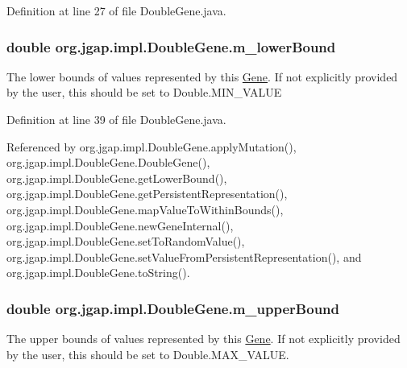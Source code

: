 Definition at line 27 of file Double\-Gene.\-java.

\hypertarget{classorg_1_1jgap_1_1impl_1_1_double_gene_a07193d7a0dc9a450d41463104ee72f02}{
\subsubsection[{m\-\_\-lower\-Bound}]{\setlength{\rightskip}{0pt plus 5cm}double org.\-jgap.\-impl.\-Double\-Gene.\-m\-\_\-lower\-Bound\hspace{0.3cm}{\ttfamily [private]}}}\label{classorg_1_1jgap_1_1impl_1_1_double_gene_a07193d7a0dc9a450d41463104ee72f02}
The lower bounds of values represented by this \hyperlink{interfaceorg_1_1jgap_1_1_gene}{Gene}. If not explicitly provided by the user, this should be set to Double.\-M\-I\-N\-\_\-\-V\-A\-L\-U\-E 

Definition at line 39 of file Double\-Gene.\-java.



Referenced by org.\-jgap.\-impl.\-Double\-Gene.\-apply\-Mutation(), org.\-jgap.\-impl.\-Double\-Gene.\-Double\-Gene(), org.\-jgap.\-impl.\-Double\-Gene.\-get\-Lower\-Bound(), org.\-jgap.\-impl.\-Double\-Gene.\-get\-Persistent\-Representation(), org.\-jgap.\-impl.\-Double\-Gene.\-map\-Value\-To\-Within\-Bounds(), org.\-jgap.\-impl.\-Double\-Gene.\-new\-Gene\-Internal(), org.\-jgap.\-impl.\-Double\-Gene.\-set\-To\-Random\-Value(), org.\-jgap.\-impl.\-Double\-Gene.\-set\-Value\-From\-Persistent\-Representation(), and org.\-jgap.\-impl.\-Double\-Gene.\-to\-String().

\hypertarget{classorg_1_1jgap_1_1impl_1_1_double_gene_a258aa95e2039227c87fb0c78758bba8b}{
\subsubsection[{m\-\_\-upper\-Bound}]{\setlength{\rightskip}{0pt plus 5cm}double org.\-jgap.\-impl.\-Double\-Gene.\-m\-\_\-upper\-Bound\hspace{0.3cm}{\ttfamily [private]}}}\label{classorg_1_1jgap_1_1impl_1_1_double_gene_a258aa95e2039227c87fb0c78758bba8b}
The upper bounds of values represented by this \hyperlink{interfaceorg_1_1jgap_1_1_gene}{Gene}. If not explicitly provided by the user, this should be set to Double.\-M\-A\-X\-\_\-\-V\-A\-L\-U\-E. 

